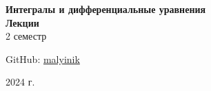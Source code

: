 



\begin{titlepage}
    \vspace*{0pt}
    \vfill
    \centering
    \Huge\textbf{Интегралы и дифференциальные уравнения} \\[7pt]
    \Large\textbf{Лекции} \\
    \large 2 семестр \\ 
    \vfill
    \begin{flushright}
        \normalsize GitHub: \href{https://github.com/malyinik}{malyinik} \\
    \end{flushright}
    \normalsize 2024 г.
\end{titlepage}
\newpage

\tableofcontents
\newpage

\newpage
\zerocounter

\newpage
\zerocounter

\newpage
\zerocounter

\newpage
\zerocounter

\newpage
\zerocounter

\newpage
\zerocounter

\newpage
\zerocounter

\newpage
\zerocounter

\newpage
\zerocounter

\newpage
\zerocounter



